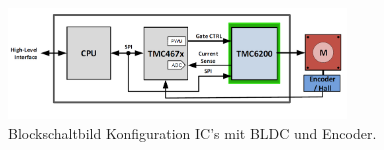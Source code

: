 \begin{figure}[H]
	\centering
	\includegraphics[width=0.8\textwidth]{graphics/Blockdiagramm_TMC4671_und_TMC6200}
	\caption{Blockschaltbild Konfiguration IC's mit BLDC und Encoder. \cite[S.1]{trinamicmotion_control_gmbh__co_kg_tmc6200_2019}}
	\label{fig:Blockdiagramm_TMC4671_und_TMC6200}
\end{figure}



